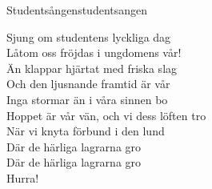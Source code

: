 \begin{song}{Studentsången}{studentsangen}
\begin{vers}
Sjung om studentens lyckliga dag\\
Låtom oss fröjdas i ungdomens vår!\\
Än klappar hjärtat med friska slag\\
Och den ljusnande framtid är vår\\
Inga stormar än i våra sinnen bo\\
Hoppet är vår vän, och vi dess löften tro\\
När vi knyta förbund i den lund\\
Där de härliga lagrarna gro\\
Där de härliga lagrarna gro\\
Hurra!\\
\end{vers}
\end{song}
